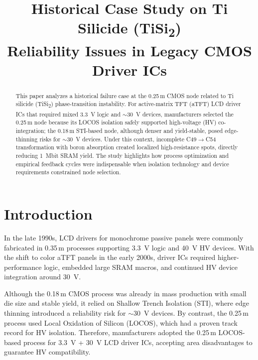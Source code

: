 \documentclass[conference]{IEEEtran}
\begin{document}
\title{Historical Case Study on Ti Silicide (TiSi\textsubscript{2})\\
Reliability Issues in Legacy CMOS Driver ICs}

\author{
}

\maketitle

\begin{abstract}
This paper analyzes a historical failure case at the 0.25\,\textmu m CMOS node related to Ti silicide (TiSi\textsubscript{2}) phase-transition instability. 
For active-matrix TFT (aTFT) LCD driver ICs that required mixed 3.3~V logic and $\sim$30~V devices, manufacturers selected the 0.25\,\textmu m node because its LOCOS isolation safely supported high-voltage (HV) co-integration; the 0.18\,\textmu m STI-based node, although denser and yield-stable, posed edge-thinning risks for $\sim$30~V devices. 
Under this context, incomplete C49$\rightarrow$C54 transformation with boron absorption created localized high-resistance spots, directly reducing 1~Mbit SRAM yield.
The study highlights how process optimization and empirical feedback cycles were indispensable when isolation technology and device requirements constrained node selection.
\end{abstract}

\section{Introduction}
In the late 1990s, LCD drivers for monochrome passive panels were commonly fabricated in 0.35\,\textmu m processes supporting 3.3~V logic and 40~V HV devices.
With the shift to color aTFT panels in the early 2000s, driver ICs required higher-performance logic, embedded large SRAM macros, and continued HV device integration around 30~V.

Although the 0.18\,\textmu m CMOS process was already in mass production with small die size and stable yield, it relied on Shallow Trench Isolation (STI), where edge thinning introduced a reliability risk for $\sim$30~V devices.
By contrast, the 0.25\,\textmu m process used Local Oxidation of Silicon (LOCOS), which had a proven track record for HV isolation.
Therefore, manufacturers adopted the 0.25\,\textmu m LOCOS-based process for 3.3~V + 30~V LCD driver ICs, accepting area disadvantages to guarantee HV compatibility.
\end{document}
